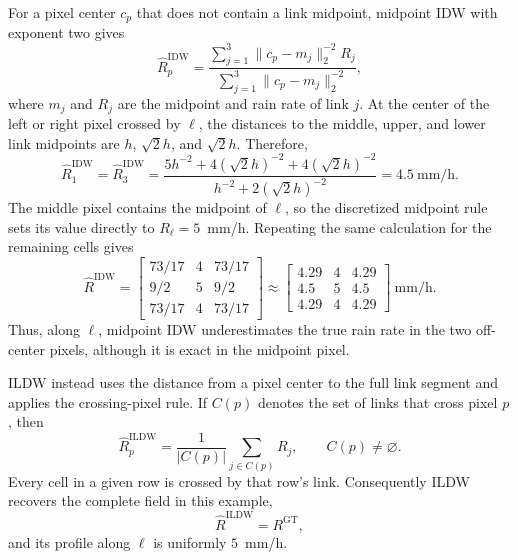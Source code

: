\documentclass[10pt]{article}
\begin{document}
For a pixel center $c_p$ that does not contain a link midpoint, midpoint IDW
with exponent two gives
\begin{equation}
\widehat R_p^{\mathrm{IDW}}
=
\frac{\displaystyle\sum_{j=1}^{3}
      \lVert c_p-m_j\rVert_2^{-2}R_j}
     {\displaystyle\sum_{j=1}^{3}
      \lVert c_p-m_j\rVert_2^{-2}},
\label{eq:idw}
\end{equation}
where $m_j$ and $R_j$ are the midpoint and rain rate of link $j$.  At the
center of the left or right pixel crossed by $\ell$, the distances to the
middle, upper, and lower link midpoints are $h$, $\sqrt{2}h$, and
$\sqrt{2}h$.  Therefore,
\begin{equation}
\widehat R_{1}^{\mathrm{IDW}}
=\widehat R_{3}^{\mathrm{IDW}}
=\frac{5h^{-2}+4(\sqrt{2}h)^{-2}+4(\sqrt{2}h)^{-2}}
       {h^{-2}+2(\sqrt{2}h)^{-2}}
=4.5\ \mathrm{mm/h}.
\label{eq:idw-crossed}
\end{equation}
The middle pixel contains the midpoint of $\ell$, so the discretized midpoint
rule sets its value directly to $R_\ell=5$~mm/h.  Repeating the same
calculation for the remaining cells gives
\begin{equation}
\widehat R^{\mathrm{IDW}}=
\begin{bmatrix}
73/17&4&73/17\\
9/2&5&9/2\\
73/17&4&73/17
\end{bmatrix}
\approx
\begin{bmatrix}
4.29&4&4.29\\
4.5&5&4.5\\
4.29&4&4.29
\end{bmatrix}\ \mathrm{mm/h}.
\label{eq:idw-field}
\end{equation}
Thus, along $\ell$, midpoint IDW underestimates the true rain rate in the two
off-center pixels, although it is exact in the midpoint pixel.

ILDW instead uses the distance from a pixel center to the full link segment
and applies the crossing-pixel rule.  If $C(p)$ denotes the set of links that
cross pixel $p$, then
\begin{equation}
\widehat R_p^{\mathrm{ILDW}}
=\frac{1}{|C(p)|}\sum_{j\in C(p)}R_j,
\qquad C(p)\ne\varnothing.
\label{eq:ildw-crossing}
\end{equation}
Every cell in a given row is crossed by that row's link.  Consequently ILDW
recovers the complete field in this example,
\begin{equation}
\widehat R^{\mathrm{ILDW}}=R^{\mathrm{GT}},
\end{equation}
and its profile along $\ell$ is uniformly $5$~mm/h.
\end{document}
